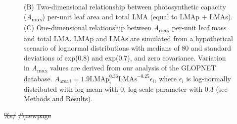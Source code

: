 \documentclass[
  12pt,
]{article}
\providecommand{\DIFdeltex}[1]{{\protect\color{red}\sout{#1}}}                      %
\providecommand{\DIFdelbegin}{} %
\providecommand{\DIFaddendFL}{} %
\providecommand{\DIFdel}[1]{\texorpdfstring{\DIFdeltex{#1}}{}} %
\newcommand{\DIFscaledelfig}{0.5}
\newlength{\DIFdelgraphicswidth} %
\newlength{\DIFdelgraphicsheight} %
\newcommand{\DIFdelincludegraphics}[2][]{%
\sbox{\DIFdelgraphicsbox}{\DIFOincludegraphics[#1]{#2}}%
\settoboxwidth{\DIFdelgraphicswidth}{\DIFdelgraphicsbox} %
\settoboxtotalheight{\DIFdelgraphicsheight}{\DIFdelgraphicsbox} %
\scalebox{\DIFscaledelfig}{%
\parbox[b]{\DIFdelgraphicswidth}{\usebox{\DIFdelgraphicsbox}\\[-\baselineskip] \rule{\DIFdelgraphicswidth}{0em}}\llap{\resizebox{\DIFdelgraphicswidth}{\DIFdelgraphicsheight}{%
\setlength{\unitlength}{\DIFdelgraphicswidth}%
\begin{picture}(1,1)%
\thicklines\linethickness{2pt} %
{\color[rgb]{1,0,0}\put(0,0){\framebox(1,1){}}}%
{\color[rgb]{1,0,0}\put(0,0){\line( 1,1){1}}}%
{\color[rgb]{1,0,0}\put(0,1){\line(1,-1){1}}}%
\end{picture}%
}\hspace*{3pt}}} %
} %
\DeclareRobustCommand{\DIFdelbegin}{\DIFOdelbegin \let\includegraphics\DIFdelincludegraphics} %
\DeclareRobustCommand{\DIFaddendFL}{\DIFOaddendFL \let\includegraphics\DIFOincludegraphics} %
\begin{document}
\begin{figure}
{{(B) Two-dimensional relationship between photosynthetic capacity (\emph{A}\textsubscript{max}) per-unit leaf area and total LMA (equal to LMAp + LMAs).
(C) One-dimensional relationship between \emph{A}\textsubscript{max} per-unit leaf mass and total LMA.
LMAp and LMAs are simulated from a hypothetical scenario of lognormal distributions with medians of 80 and standard deviations of exp(0.8) and exp(0.7), and zero covariance.
Variation in \emph{A}\textsubscript{max} values are derived from our analysis of the GLOPNET database. \(A_{\mathrm{area} \, i}=1.9\mathrm{LMAp}_i^{0.36}\mathrm{LMAs}^{-0.25}\epsilon_i\), where \(\epsilon_i\) is log-normally distributed with log-mean with 0, log-scale parameter with 0.3 (see Methods and Results).}\label{fig:Hplt}
}
\DIFaddendFL \end{figure}

\DIFdelbegin \DIFdel{\%s/}%
\DIFdel{/\textbackslash newpage
}%
\end{document}
